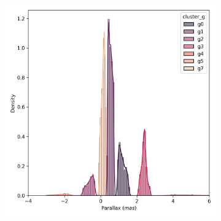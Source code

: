 \documentclass[preprint,12pt,authoryear]{elsarticle}
\begin{document}
\begin{figure}[!hbt]
\begin{subfigure}{0.29\textwidth}
  \end{subfigure}
  \begin{subfigure}{0.29\textwidth}
    \includegraphics[width=\textwidth]{../figures/ngc_2516/dec_parallax_filtered_ngc_2516.png}
  \end{subfigure}


\end{figure}
\end{document}
